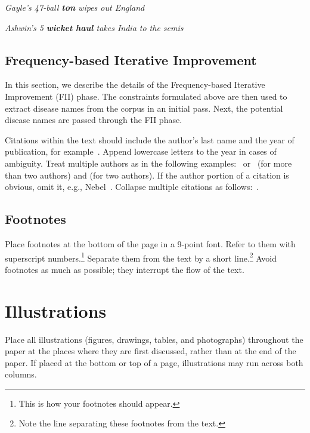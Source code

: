 \documentclass{article}
\begin{document}
\textit{Gayle's 47-ball \textbf{ton} wipes out England }

\textit{Ashwin's 5 \textbf{wicket haul} takes India to the semis}


\subsection{Frequency-based Iterative Improvement}

In this section, we describe the details of the Frequency-based Iterative Improvement (FII) phase. 
The constraints formulated above are then used to extract disease names from the corpus in an initial pass. Next, the potential disease names are passed through the FII phase.

Citations within the text should include the author's last name and
the year of publication, for example~\cite{gottlob:nonmon}.  Append
lowercase letters to the year in cases of ambiguity.  Treat multiple
authors as in the following examples:~\cite{abelson-et-al:scheme}
or~\cite{bgf:Lixto} (for more than two authors) and
\cite{brachman-schmolze:kl-one} (for two authors).  If the author
portion of a citation is obvious, omit it, e.g.,
Nebel~.  Collapse multiple citations as
follows:~\cite{gls:hypertrees,levesque:functional-foundations}.
\nocite{abelson-et-al:scheme}
\nocite{bgf:Lixto}
\nocite{brachman-schmolze:kl-one}
\nocite{gottlob:nonmon}
\nocite{gls:hypertrees}
\nocite{levesque:functional-foundations}
\nocite{levesque:belief}
\nocite{nebel:jair-2000}

\subsection{Footnotes}

Place footnotes at the bottom of the page in a 9-point font.  Refer to
them with superscript numbers.\footnote{This is how your footnotes
should appear.} Separate them from the text by a short
line.\footnote{Note the line separating these footnotes from the
text.} Avoid footnotes as much as possible; they interrupt the flow of
the text.

\section{Illustrations}

Place all illustrations (figures, drawings, tables, and photographs)
throughout the paper at the places where they are first discussed,
rather than at the end of the paper. If placed at the bottom or top of
a page, illustrations may run across both columns.
\end{document}
